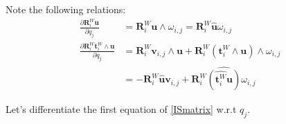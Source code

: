 Note the following relations:
\begin{align}
  \frac{\partial \mathbf{R}_i^W \mathbf{u}}{\partial q_j}
  &= \mathbf{R}_i^W \mathbf{u} \wedge \omega_{i,j}
  = \mathbf{R}_i^W \widehat{\mathbf{u}} \omega_{i,j}
  \\
  \frac{\partial \mathbf{R}_i^W \mathbf{t}^W_i\wedge \mathbf{u}}{\partial q_j}
  &= \mathbf{R}_i^W \mathbf{v}_{i,j} \wedge \mathbf{u}
  + \mathbf{R}_i^W \left(\mathbf{t}^W_i\wedge\mathbf{u}\right) \wedge \omega_{i,j}\\
  &= -\mathbf{R}_i^W \widehat{\mathbf{u}} \mathbf{v}_{i,j}
  + \mathbf{R}_i^W \widehat{\left(\widehat{\mathbf{t}^W_i}\mathbf{u}\right)} \omega_{i,j}
\end{align}

Let's differentiate the first equation of \ref{ISmatrix} w.r.t $q_j$.

